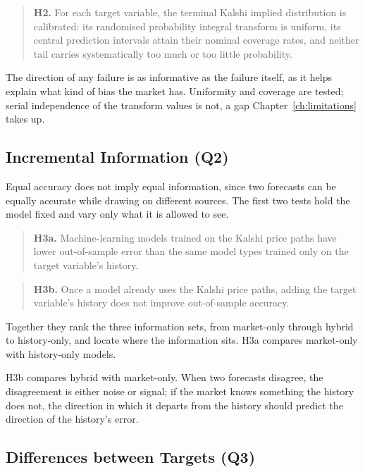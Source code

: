 \documentclass[12pt,a4paper]{report}
\begin{document}
\begin{quote}
\textbf{H2.} For each target variable, the terminal Kalshi implied
distribution is calibrated: its randomised probability integral transform is
uniform, its central prediction intervals attain their nominal coverage rates,
and neither tail carries systematically too much or too little probability.
\end{quote}

The direction of any failure is as informative as the failure itself, as
it helps explain what kind of bias the market has. Uniformity and coverage are tested; serial independence of the
transform values is not, a gap Chapter~\ref{ch:limitations} takes up.

\subsection{Incremental Information (Q2)}

Equal accuracy does not imply equal information, since two forecasts can be
equally accurate while drawing on different sources. The first two tests hold
the model fixed and vary only what it is allowed to see.

\begin{quote}
\textbf{H3a.} Machine-learning models trained on the Kalshi price paths have
lower out-of-sample error than the same model types trained only on the target
variable's history.
\end{quote}

\begin{quote}
\textbf{H3b.} Once a model already uses the Kalshi price paths, adding the
target variable's history does not improve out-of-sample accuracy.
\end{quote}

Together they rank the three information sets, from market-only through hybrid
to history-only, and locate where the information sits. H3a compares market-only with history-only models.

H3b compares hybrid with market-only. When
two forecasts disagree, the disagreement is either noise or signal; if the
market knows something the history does not, the direction in which it
departs from the history should predict the direction of the history's
error.

\subsection{Differences between Targets (Q3)}
\end{document}
